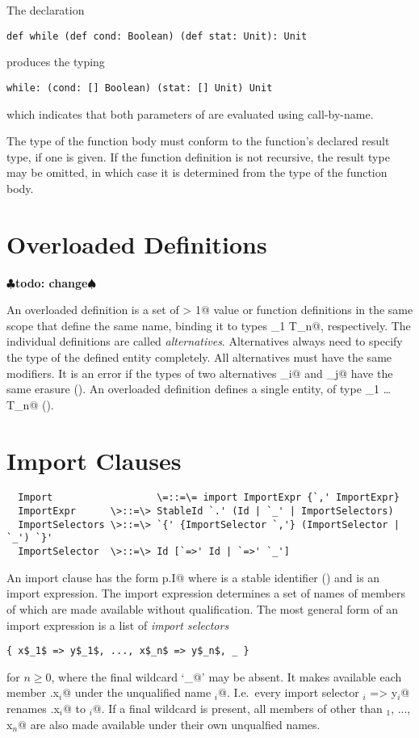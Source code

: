 \documentclass[11pt]{report}
\renewcommand{\todo}[1]{{$\clubsuit$\bf todo: #1$\spadesuit$}}
\begin{document}
\example The declaration
\begin{verbatim}
def while (def cond: Boolean) (def stat: Unit): Unit
\end{verbatim}
produces the typing
\begin{verbatim}
while: (cond: [] Boolean) (stat: [] Unit) Unit
\end{verbatim}
which indicates that both parameters of \verb@while@ are evaluated using
call-by-name.

The type of the function body must conform to the function's declared
result type, if one is given. If the function definition is not
recursive, the result type may be omitted, in which case it is
determined from the type of the function body.


\section{Overloaded Definitions}
\label{sec:overloaded-defs}
\todo{change}

An overloaded definition is a set of \verb@n > 1@ value or function
definitions in the same scope that define the same name, binding it to
types \verb@T_1 \commadots T_n@, respectively.  The individual
definitions are called {\em alternatives}.  Alternatives always need
to specify the type of the defined entity completely.  All
alternatives must have the same modifiers. It is an error if the types
of two alternatives \verb@T_i@ and \verb@T_j@ have the same erasure
().  An overloaded definition defines a single
entity, of type \verb@T_1 \overload \ldots \overload T_n@
().

\section{Import Clauses}
\label{sec:import}

\syntax\begin{verbatim}
  Import                  \=::=\= import ImportExpr {`,' ImportExpr}
  ImportExpr      \>::=\> StableId `.' (Id | `_' | ImportSelectors)
  ImportSelectors \>::=\> `{' {ImportSelector `,'} (ImportSelector | `_') `}'
  ImportSelector  \>::=\> Id [`=>' Id | `=>' `_']
\end{verbatim}

An import clause has the form \verb@import p.I@ where \verb@p@ is a stable
identifier () and \verb@I@ is an import expression.
The import expression determines a set of names of members of \verb@p@
which are made available without qualification. The most general form
of an import expression is a list of {\em import selectors}
\begin{verbatim}
{ x$_1$ => y$_1$, ..., x$_n$ => y$_n$, _ }
\end{verbatim}
for $n \geq 0$, where the final wildcard `\verb@_@' may be absent.  It
makes available each member \verb@p.x$_i$@ under the unqualified name
\verb@y$_i$@. I.e.\ every import selector \verb@x$_i$ => y$_i$@ renames
\verb@p.x$_i$@ to
\verb@y$_i$@.  If a final wildcard is present, all members \verb@z@ of
\verb@p@ other than \verb@x$_1$, ..., x$_n$@ are also made available
under their own unqualfied names.
\end{document}
